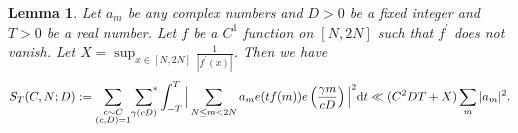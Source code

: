 \documentclass[12pt,a4paper,twoside, reqno]{amsart}
\newcommand{\shortmod}{\ensuremath{\negthickspace \negthickspace \negthickspace \pmod}}
\newcommand{\sumstar}{\sideset{}{^*}\sum}
\newtheorem{lemma}{Lemma}
\begin{document}
\begin{lemma}\label{hybrid large-sieve with level}
    Let $a_m$ be  any complex numbers  and $D>0$ be a fixed  integer and $T >0 $ be a real number. Let $f$ be a $C^1$ function on $[N,2N]$ such that $f^\prime$ does not vanish. Let  $X=\sup_{x \in [N,2N]} \frac{1}{|f^\prime(x)|}$. Then we have  
    \begin{align*}
   S_T(C,N;D):=\mathop{\sum_{\substack{c \sim C \\ (c,D)=1}}}\sumstar_{\gamma (cD)} \int_{-T}^{T} \Big|\sum_{N \leq m <  2N} a_m  e(tf(m)) e\left( \frac{\gamma m}{cD} \right) \Big| ^2\mathrm{d}t  \ll  (C^2DT+X) \sum_m|a_m|^2.
\end{align*}
\end{lemma}
\end{document}
